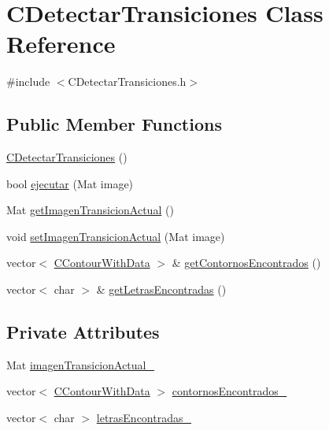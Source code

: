 \hypertarget{classCDetectarTransiciones}{}\section{C\+Detectar\+Transiciones Class Reference}
\label{classCDetectarTransiciones}


{\ttfamily \#include $<$C\+Detectar\+Transiciones.\+h$>$}

\subsection*{Public Member Functions}
\begin{DoxyCompactItemize}
\item 
\hyperlink{classCDetectarTransiciones_a99c333a4c8c5a4bb0e03ac09ab6e50b9}{C\+Detectar\+Transiciones} ()
\item 
bool \hyperlink{classCDetectarTransiciones_a19b374a5d7b5ddb01fada5b3a9d952d7}{ejecutar} (Mat image)
\item 
Mat \hyperlink{classCDetectarTransiciones_aa9cea5befc08385a46baf86adc305737}{get\+Imagen\+Transicion\+Actual} ()
\item 
void \hyperlink{classCDetectarTransiciones_a9f341c8df22490d46b266844b16f8585}{set\+Imagen\+Transicion\+Actual} (Mat image)
\item 
vector$<$ \hyperlink{classCContourWithData}{C\+Contour\+With\+Data} $>$ \& \hyperlink{classCDetectarTransiciones_a729c3aaffe2cc888e62c81a58814c1e9}{get\+Contornos\+Encontrados} ()
\item 
vector$<$ char $>$ \& \hyperlink{classCDetectarTransiciones_a1e7c9eac75874737cf7a2b7d7a4375c7}{get\+Letras\+Encontradas} ()
\end{DoxyCompactItemize}
\subsection*{Private Attributes}
\begin{DoxyCompactItemize}
\item 
Mat \hyperlink{classCDetectarTransiciones_aa58ae70139c85dc3838338eb53a520d3}{imagen\+Transicion\+Actual\+\_\+}
\item 
vector$<$ \hyperlink{classCContourWithData}{C\+Contour\+With\+Data} $>$ \hyperlink{classCDetectarTransiciones_a76910f415a085c5e73126ec3fb62a174}{contornos\+Encontrados\+\_\+}
\item 
vector$<$ char $>$ \hyperlink{classCDetectarTransiciones_a0bc5a3fc42f833f3e649e8b8c2fe573d}{letras\+Encontradas\+\_\+}
\end{DoxyCompactItemize}


